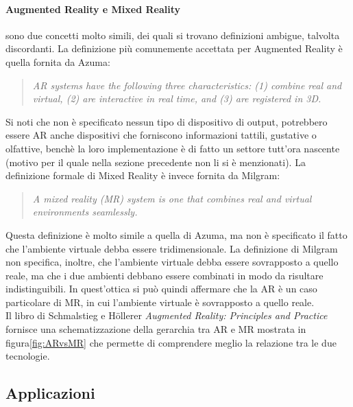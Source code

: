         \paragraph{Augmented Reality e Mixed Reality} sono due concetti molto simili, dei quali si trovano
            definizioni ambigue, talvolta discordanti. La definizione più comunemente accettata per Augmented 
            Reality è quella fornita da Azuma\cite{Azuma1997}:
            \begin{quote}
                \textit{AR systems have the following three characteristics: (1) combine real and virtual, 
                (2) are interactive in real time, and (3) are registered in 3D.}
            \end{quote}
            Si noti che non è specificato nessun tipo di dispositivo di output, potrebbero essere 
            AR anche dispositivi che forniscono informazioni tattili, gustative o olfattive, benchè
            la loro implementazione è di fatto un settore tutt'ora nascente (motivo per il quale nella sezione
            precedente non li si è menzionati). La definizione formale di Mixed Reality è invece 
            fornita da Milgram\cite{Milgram1994}:
            \begin{quote}
                \textit{A mixed reality (MR) system is one that combines real and virtual environments 
                seamlessly.}
            \end{quote}
            Questa definizione è molto simile a quella di Azuma, ma non è specificato il fatto che
            l'ambiente virtuale debba essere tridimensionale. La definizione di Milgram
            non specifica, inoltre, che l'ambiente virtuale debba essere sovrapposto a quello reale, ma che
            i due ambienti debbano essere combinati in modo da risultare indistinguibili. In quest'ottica 
            si può quindi affermare che la AR è un caso particolare di MR, in cui l'ambiente virtuale è
            sovrapposto a quello reale. \\
            Il libro di Schmalstieg e Höllerer \textit{Augmented Reality: Principles and Practice}\cite{Schmalstieg2016} 
            fornisce una schematizzazione della gerarchia tra AR e MR mostrata in figura\ref{fig:ARvsMR}
            che permette di comprendere meglio la relazione tra le due tecnologie. 
            
    \subsection{Applicazioni}\label{subsec:XRTipologie}
        

